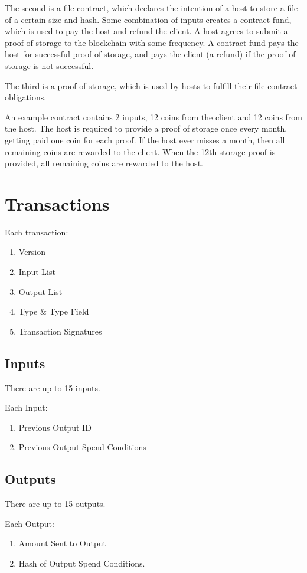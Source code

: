 \documentclass[twocolumn]{article}
\begin{document}
The second is a file contract, which declares the intention of a host to store a file of a certain size and hash.
Some combination of inputs creates a contract fund, which is used to pay the host and refund the client.
A host agrees to submit a proof-of-storage to the blockchain with some frequency.
A contract fund pays the host for successful proof of storage, and pays the client (a refund) if the proof of storage is not successful.

The third is a proof of storage, which is used by hosts to fulfill their file contract obligations.

An example contract contains 2 inputs, 12 coins from the client and 12 coins from the host.
The host is required to provide a proof of storage once every month, getting paid one coin for each proof.
If the host ever misses a month, then all remaining coins are rewarded to the client.
When the 12th storage proof is provided, all remaining coins are rewarded to the host.

\section{Transactions}
Each transaction:
\begin{enumerate}
	\item Version
	\item Input List
	\item Output List
	\item Type \& Type Field
	\item Transaction Signatures
\end{enumerate}

\subsection{Inputs}
There are up to 15 inputs.

Each Input:
\begin{enumerate}
	\item Previous Output ID
	\item Previous Output Spend Conditions
\end{enumerate}

\subsection{Outputs}
There are up to 15 outputs.

Each Output:
\begin{enumerate}
	\item Amount Sent to Output
	\item Hash of Output Spend Conditions.
\end{enumerate}
\end{document}
